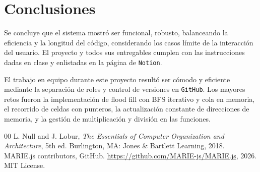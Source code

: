 \documentclass[conference]{IEEEtran}
\begin{document}
\section{Conclusiones}

Se concluye que el sistema mostró ser funcional, robusto, balanceando la eficiencia y la longitud del código, considerando los casos límite de la interacción del usuario. El proyecto y todos sus entregables cumplen con las instrucciones dadas en clase y enlistadas en la página de \texttt{Notion}.

El trabajo en equipo durante este proyecto resultó ser cómodo y eficiente mediante la separación de roles y control de versiones en \texttt{GitHub}. Los mayores retos fueron la implementación de flood fill con BFS iterativo y cola en memoria, el recorrido de celdas con punteros, la actualización constante de direcciones de memoria, y la gestión de multiplicación y división en las funciones.

\begin{thebibliography}{00}
 L. Null and J. Lobur, \textit{The Essentials of Computer Organization and Architecture}, 5th ed. Burlington, MA: Jones \& Bartlett Learning, 2018.
 MARIE.js contributors, GitHub. \url{https://github.com/MARIE-js/MARIE.js}, 2026. MIT License.
\end{thebibliography}
\end{document}
